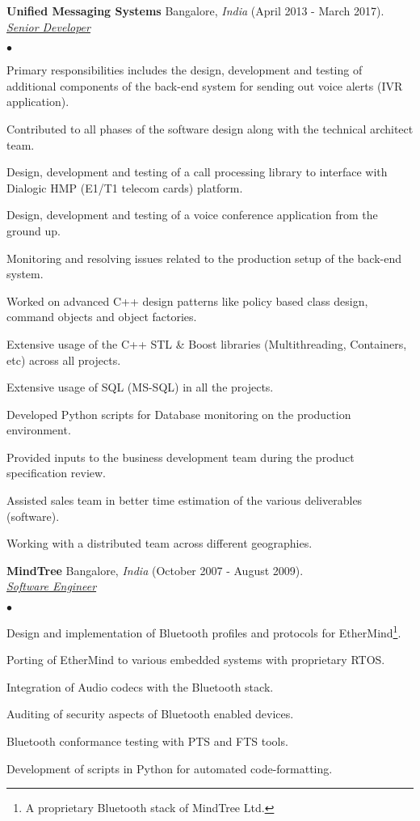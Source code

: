 \documentclass[a4paper]{article}
\newcommand{\employer}[4]{{ \textbf{#1} #2  (#3).\\ \underline{\emph{#4}}\\  }}
\newenvironment{achievements}{\begin{list}{$\bullet$}{\topsep 0pt \itemsep -2pt}}{\vspace*{4pt}\end{list}}
\begin{document}
\employer{Unified Messaging Systems} {Bangalore, \textit{India}} {April 2013 - March 2017} {Senior Developer}
	\begin{achievements}
  \item Primary responsibilities includes the design, development and testing of additional components of the back-end system for sending out voice alerts (IVR application).
  \item Contributed to all phases of the software design along with the technical architect team.
    \item Design, development and testing of a call processing library to interface with Dialogic HMP (E1/T1 telecom cards) platform.
  \item Design, development and testing of a voice conference application from the ground up.
  \item Monitoring and resolving issues related to the production setup of the back-end system.
  \item Worked on advanced C++ design patterns like policy based class design, command objects and object factories.
  \item Extensive usage of the C++ STL \& Boost libraries (Multithreading, Containers, etc) across all projects.
  \item Extensive usage of SQL (MS-SQL) in all the projects.
  \item Developed Python scripts for Database monitoring on the production environment.
  \item Provided inputs to the business development team during the product specification review.
  \item Assisted sales team in better time estimation of the various deliverables (software).
  \item Working with a distributed team across different geographies.
	\end{achievements}

\employer{MindTree} {Bangalore, \textit{India}}{October 2007 - August 2009} {Software Engineer}
	\begin{achievements}
	\item Design and implementation of Bluetooth profiles and protocols for EtherMind\footnote[2]{A proprietary Bluetooth stack of MindTree Ltd.}.
	\item Porting of EtherMind to various embedded systems with proprietary RTOS.
	\item Integration of Audio codecs with the Bluetooth stack.
	\item Auditing of security aspects of Bluetooth enabled devices.
	\item Bluetooth conformance testing with PTS and FTS tools.
	\item Development of scripts in Python for automated code-formatting.
	\end{achievements}
\end{document}
